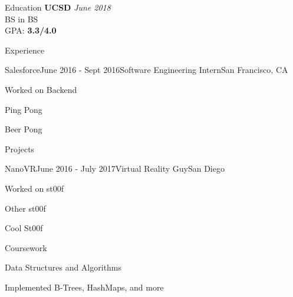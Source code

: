 \documentclass{resume}
\begin{document}
\begin{rSection}{Education}
{\bf UCSD} \hfill {\em June 2018}
\\ BS in BS
\\ GPA: {\bf 3.3/4.0}
\end{rSection}
\begin{rSection}{Experience}
\begin{rSubsection}{Salesforce}{June 2016 {-} Sept 2016}{Software Engineering Intern}{San Francisco, CA}
\item Worked on Backend
\item Ping Pong
\item Beer Pong
\end{rSubsection}
\end{rSection}
\begin{rSection}{Projects}
\begin{rSubsection}{NanoVR}{June 2016 {-} July 2017}{Virtual Reality Guy}{San Diego}
\item Worked on st00f
\item Other st00f
\item Cool St00f
\end{rSubsection}
\end{rSection}
\begin{rSection}{Coursework}
\begin{rSubsection}{Data Structures and Algorithms}{}{}{}
\item Implemented B-Trees, HashMaps, and more
\end{rSubsection}
\end{rSection}
\end{document}
